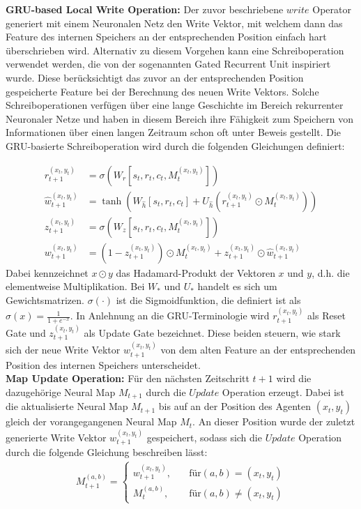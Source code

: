 \textbf{GRU-based Local Write Operation:} Der zuvor beschriebene $write$ Operator generiert mit einem Neuronalen Netz den Write Vektor, mit welchem dann das Feature des internen Speichers an der entsprechenden Position einfach hart überschrieben wird. Alternativ zu diesem Vorgehen kann eine Schreiboperation verwendet werden, die von der sogenannten Gated Recurrent Unit inspiriert wurde. Diese berücksichtigt das zuvor an der entsprechenden Position gespeicherte Feature bei der Berechnung des neuen Write Vektors. Solche Schreiboperationen verfügen über eine lange Geschichte im Bereich rekurrenter Neuronaler Netze und haben in diesem Bereich ihre Fähigkeit zum Speichern von Informationen über einen langen Zeitraum schon oft unter Beweis gestellt. Die GRU-basierte Schreiboperation wird durch die folgenden Gleichungen definiert:

\begin{equation*}
  \begin{align*}
    r_{t+1}^{(x_t,y_t)} &= \sigma(W_r[s_t, r_t, c_t, M_t^{(x_t,y_t)}]) \\
    \hat{w}_{t+1}^{(x_t,y_t)} &= \tanh (W_{\hat{h}}[s_t, r_t, c_t] + U_{\hat{h}}(r_{t+1}^{(x_t,y_t)} \odot M_t^{(x_t,y_t)})) \\
    z_{t+1}^{(x_t,y_t)} & = \sigma(W_z[s_t, r_t, c_t, M_t^{(x_t,y_t)}]) \\
    w_{t+1}^{(x_t,y_t)} &= (1 - z_{t+1}^{(x_t,y_t)}) \odot M_t^{(x_t,y_t)} + z_{t+1}^{(x_t,y_t)} \odot \hat{w}_{t+1}^{(x_t,y_t)}
  \end{align*}
\end{equation*}
Dabei kennzeichnet $x \odot y$ das Hadamard-Produkt der Vektoren $x$ und $y$, d.h. die elementweise Multiplikation. Bei $W_*$ und $U_*$ handelt es sich um Gewichtsmatrizen. $\sigma(\cdot)$ ist die Sigmoidfunktion, die definiert ist als $\sigma(x) = \frac{1}{1+e^{-x}}$. In Anlehnung an die GRU-Terminologie wird $r_{t+1}^{(x_t,y_t)}$ als Reset Gate und $z_{t+1}^{(x_t,y_t)}$ als Update Gate bezeichnet. Diese beiden steuern, wie stark sich der neue Write Vektor $w_{t+1}^{(x_t,y_t)}$ von dem alten Feature an der entsprechenden Position des internen Speichers unterscheidet.\\[0.1in]
\textbf{Map Update Operation:} Für den nächsten Zeitschritt $t+1$ wird die dazugehörige Neural Map $M_{t+1}$ durch die $Update$ Operation erzeugt. Dabei ist die aktualisierte Neural Map $M_{t+1}$ bis auf an der Position des Agenten $(x_t,y_t)$ gleich der vorangegangenen Neural Map $M_t$. An dieser Position wurde der zuletzt generierte Write Vektor $w_{t+1}^{(x_t,y_t)}$ gespeichert, sodass sich die $Update$ Operation durch die folgende Gleichung beschreiben lässt:
\begin{equation*}
  \begin{align*}
    M_{t+1}^{(a,b)} =
    \begin{cases}
      w_{t+1}^{(x_t,y_t)}, & \quad \text{für} (a,b) = (x_t,y_t) \\
      M_t^{(a,b)}, & \quad \text{für} (a,b) \ne (x_t,y_t)
    \end{cases}
  \end{align*}
\end{equation*}


